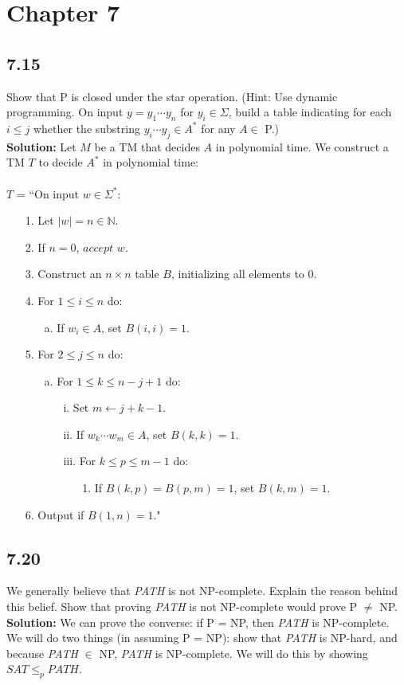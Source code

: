 \section{Chapter 7}

\subsection*{7.15} Show that P is closed under the star operation. (Hint: Use dynamic programming. On input $y = y_1\cdots y_n$ for $y_i \in \Sigma$, build a table indicating for each $i \le j$ whether the substring $y_i\cdots y_j \in A^*$ for any $A \in$ P.)
\\
\textbf{Solution:} Let $M$ be a TM that decides $A$ in polynomial time. We construct a TM $T$ to decide $A^*$ in polynomial time:
\\ \\
$T$ = ``On input $w \in \Sigma^*$:
\begin{enumerate}
\item[1.]Let $|w| = n \in \mathbb{N}$.
\item[2.]If $n = 0$, $accept$ $w$.
\item[3.]Construct an $n \times n$ table $B$, initializing all elements to 0.
\item[4.]For $1 \le i \le n$ do:
\begin{enumerate}
\item[a.]If $w_i \in A$, set $B(i, i) = 1$.
\end{enumerate}
\item[5.]For $2 \le j \le n$ do:
\begin{enumerate}
\item[a.]For $1 \le k \le n-j+1$ do:
\begin{enumerate}
\item[i.]Set $m \leftarrow j+k-1$.
\item[ii.]If $w_k\cdots w_m \in A$, set $B(k,k) = 1$.
\item[iii.]For $k \le p \le m-1$ do:
\begin{enumerate}
\item[1.]If $B(k, p) = B(p, m) = 1$, set $B(k, m) = 1$.
\end{enumerate}
\end{enumerate}
\end{enumerate}
\item[6.]Output if $B(1, n) = 1$."
\end{enumerate}

\subsection*{7.20} We generally believe that \emph{PATH} is not NP-complete. Explain the reason behind this belief. Show that proving \emph{PATH} is not NP-complete would prove P $\ne$ NP.
\\
\textbf{Solution:} We can prove the converse: if P = NP, then \emph{PATH} is NP-complete. We will do two things (in assuming P = NP): show that \emph{PATH} is NP-hard, and because \emph{PATH} $\in$ NP, \emph{PATH} is NP-complete. We will do this by showing $SAT \le_p PATH$.

